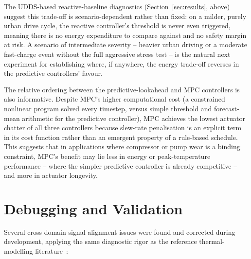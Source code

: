 \documentclass[10pt,conference]{IEEEtran}
\begin{document}
The UDDS-based reactive-baseline diagnostics (Section~\ref{sec:results}, above) suggest this trade-off is scenario-dependent rather than fixed: on a milder, purely urban drive cycle, the reactive controller's threshold is never even triggered, meaning there is no energy expenditure to compare against and no safety margin at risk. A scenario of intermediate severity -- heavier urban driving or a moderate fast-charge event without the full aggressive stress test -- is the natural next experiment for establishing where, if anywhere, the energy trade-off reverses in the predictive controllers' favour.

The relative ordering between the predictive-lookahead and MPC controllers is also informative. Despite MPC's higher computational cost (a constrained nonlinear program solved every timestep, versus simple threshold and forecast-mean arithmetic for the predictive controller), MPC achieves the lowest actuator chatter of all three controllers because slew-rate penalisation is an explicit term in its cost function rather than an emergent property of a rule-based schedule. This suggests that in applications where compressor or pump wear is a binding constraint, MPC's benefit may lie less in energy or peak-temperature performance -- where the simpler predictive controller is already competitive -- and more in actuator longevity.

\section{Debugging and Validation}
\label{sec:debug}

Several cross-domain signal-alignment issues were found and corrected during development, applying the same diagnostic rigor as the reference thermal-modelling literature~\cite{huria2012}:
\end{document}
